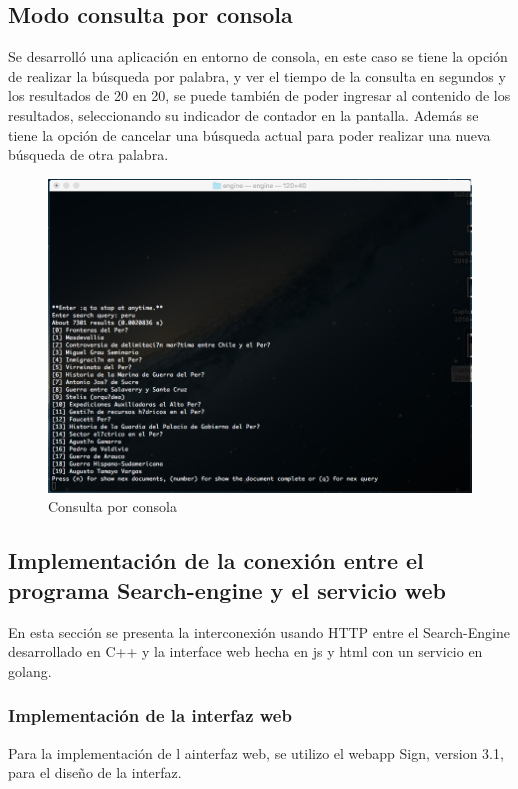 \documentclass[a4paper]{article}
\begin{document}
\subsection{Modo consulta por consola}

Se desarrolló una aplicación en entorno de consola, en este caso se tiene la opción de realizar la búsqueda por palabra, y ver el tiempo de la consulta en segundos y los resultados de 20 en 20, se puede también de poder ingresar al contenido de los resultados, seleccionando su indicador de contador en la pantalla. Además se tiene la opción de cancelar una búsqueda actual para poder realizar una nueva búsqueda de otra palabra.

\begin{figure}[H]
  \centering
  \includegraphics[width=14cm]{images/consola.png}
  \caption{Consulta por consola}
  \label{consola}
\end{figure}

\newpage

\subsection{Implementación de la conexión entre el programa Search-engine y el servicio web}

En esta sección se presenta la interconexión usando HTTP entre el Search-Engine desarrollado en C++ y la interface web hecha en js y html con un servicio en golang.

\subsubsection{Implementación de la interfaz web} 
Para la implementación de l ainterfaz web, se utilizo el webapp Sign, version 3.1, para el diseño de la interfaz.
\end{document}
